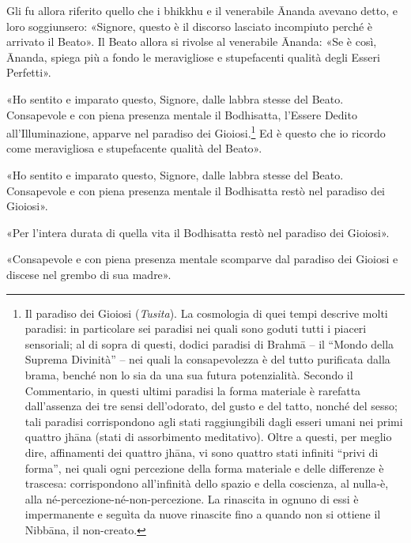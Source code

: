 Gli fu allora riferito quello che i bhikkhu e il venerabile Ānanda avevano
detto, e loro soggiunsero: «Signore, questo è il discorso lasciato incompiuto
perché è arrivato il Beato». Il Beato allora si rivolse al venerabile Ānanda:
«Se è così, Ānanda, spiega più a fondo le meravigliose e stupefacenti qualità
degli Esseri Perfetti».

«Ho sentito e imparato questo, Signore, dalle labbra stesse del Beato.
Consapevole e con piena presenza mentale il Bodhisatta, l’Essere Dedito
all’Illuminazione, apparve nel paradiso dei Gioiosi.\footnote{Il paradiso dei
  Gioiosi (\emph{Tusita}). La cosmologia di quei tempi descrive molti paradisi:
  in particolare sei paradisi nei quali sono goduti tutti i piaceri sensoriali;
  al di sopra di questi, dodici paradisi di Brahmā – il “Mondo della Suprema
  Divinità” – nei quali la consapevolezza è del tutto purificata dalla brama,
  benché non lo sia da una sua futura potenzialità. Secondo il Commentario, in
  questi ultimi paradisi la forma materiale è rarefatta dall’assenza dei tre
  sensi dell’odorato, del gusto e del tatto, nonché del sesso; tali paradisi
  corrispondono agli stati raggiungibili dagli esseri umani nei primi quattro
  jhāna (stati di assorbimento meditativo). Oltre a questi, per meglio dire,
  affinamenti dei quattro jhāna, vi sono quattro stati infiniti “privi di
  forma”, nei quali ogni percezione della forma materiale e delle differenze è
  trascesa: corrispondono all’infinità dello spazio e della coscienza, al
  nulla-è, alla né-percezione-né-non-percezione. La rinascita in ognuno di essi
  è impermanente e seguìta da nuove rinascite fino a quando non si ottiene il
  Nibbāna, il non-creato.} Ed è questo che io ricordo come meravigliosa e
stupefacente qualità del Beato».

«Ho sentito e imparato questo, Signore, dalle labbra stesse del Beato.
Consapevole e con piena presenza mentale il Bodhisatta restò nel paradiso dei
Gioiosi».

«Per l’intera durata di quella vita il Bodhisatta restò nel paradiso dei
Gioiosi».

«Consapevole e con piena presenza mentale scomparve dal paradiso dei Gioiosi e
discese nel grembo di sua madre».

